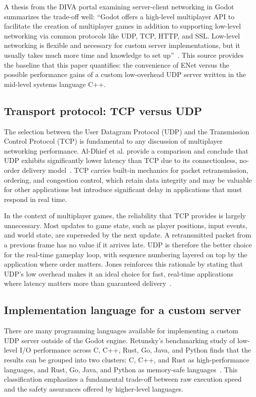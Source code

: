 \IfFileExists{IEEEtran.cls}{\ieeetrue\documentclass[conference]{IEEEtran}}{\ieeefalse\documentclass[twocolumn,10pt]{article}}
\begin{document}
A thesis from the DIVA portal examining server-client networking in Godot summarizes the trade-off well: ``Godot offers a high-level multiplayer API to facilitate the creation of multiplayer games in addition to supporting low-level networking via common protocols like UDP, TCP, HTTP, and SSL. Low-level networking is flexible and necessary for custom server implementations, but it usually takes much more time and knowledge to set up''~\cite[p.~6]{aukstakalnis2024}. This source provides the baseline that this paper quantifies: the convenience of ENet versus the possible performance gains of a custom low-overhead UDP server written in the mid-level systems language C++.

\subsection{Transport protocol: TCP versus UDP}
The selection between the User Datagram Protocol (UDP) and the Transmission Control Protocol (TCP) is fundamental to any discussion of multiplayer networking performance. Al-Dhief et al. provide a comparison and conclude that UDP exhibits significantly lower latency than TCP due to its connectionless, no-order delivery model~\cite[p.~173]{aldhief2018}. TCP carries built-in mechanics for packet retransmission, ordering, and congestion control, which retain data integrity and may be valuable for other applications but introduce significant delay in applications that must respond in real time.

In the context of multiplayer games, the reliability that TCP provides is largely unnecessary. Most updates to game state, such as player positions, input events, and world state, are superseded by the next update. A retransmitted packet from a previous frame has no value if it arrives late. UDP is therefore the better choice for the real-time gameplay loop, with sequence numbering layered on top by the application where order matters. Jones reinforces this rationale by stating that UDP's low overhead makes it an ideal choice for fast, real-time applications where latency matters more than guaranteed delivery~\cite{jones2025}.

\subsection{Implementation language for a custom server}
There are many programming languages available for implementing a custom UDP server outside of the Godot engine. Retunsky's benchmarking study of low-level I/O performance across C, C++, Rust, Go, Java, and Python finds that the results can be grouped into two clusters: C, C++, and Rust as high-performance languages, and Rust, Go, Java, and Python as memory-safe languages~\cite{retunsky2023}. %
This classification emphasizes a fundamental trade-off between raw execution speed and the safety assurances offered by higher-level languages.
\end{document}
